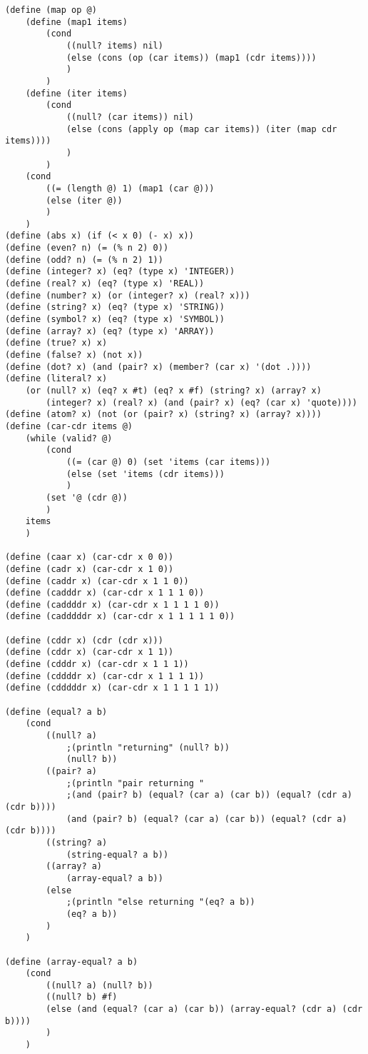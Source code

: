 \begin{verbatim}
(define (map op @)
    (define (map1 items)
        (cond
            ((null? items) nil)
            (else (cons (op (car items)) (map1 (cdr items))))
            )
        )
    (define (iter items)
        (cond
            ((null? (car items)) nil)
            (else (cons (apply op (map car items)) (iter (map cdr items))))
            )
        )
    (cond
        ((= (length @) 1) (map1 (car @)))
        (else (iter @))
        )
    )
(define (abs x) (if (< x 0) (- x) x))
(define (even? n) (= (% n 2) 0))
(define (odd? n) (= (% n 2) 1))
(define (integer? x) (eq? (type x) 'INTEGER))
(define (real? x) (eq? (type x) 'REAL))
(define (number? x) (or (integer? x) (real? x)))
(define (string? x) (eq? (type x) 'STRING))
(define (symbol? x) (eq? (type x) 'SYMBOL))
(define (array? x) (eq? (type x) 'ARRAY))
(define (true? x) x)
(define (false? x) (not x))
(define (dot? x) (and (pair? x) (member? (car x) '(dot .))))
(define (literal? x)
    (or (null? x) (eq? x #t) (eq? x #f) (string? x) (array? x)
        (integer? x) (real? x) (and (pair? x) (eq? (car x) 'quote))))
(define (atom? x) (not (or (pair? x) (string? x) (array? x))))
(define (car-cdr items @)
    (while (valid? @)
        (cond
            ((= (car @) 0) (set 'items (car items)))
            (else (set 'items (cdr items)))
            )
        (set '@ (cdr @))
        )
    items
    )

(define (caar x) (car-cdr x 0 0))
(define (cadr x) (car-cdr x 1 0))
(define (caddr x) (car-cdr x 1 1 0))
(define (cadddr x) (car-cdr x 1 1 1 0))
(define (caddddr x) (car-cdr x 1 1 1 1 0))
(define (cadddddr x) (car-cdr x 1 1 1 1 1 0))

(define (cddr x) (cdr (cdr x)))
(define (cddr x) (car-cdr x 1 1))
(define (cdddr x) (car-cdr x 1 1 1))
(define (cddddr x) (car-cdr x 1 1 1 1))
(define (cdddddr x) (car-cdr x 1 1 1 1 1))

(define (equal? a b)
    (cond
        ((null? a)
            ;(println "returning" (null? b))
            (null? b))
        ((pair? a)
            ;(println "pair returning "
            ;(and (pair? b) (equal? (car a) (car b)) (equal? (cdr a) (cdr b))))
            (and (pair? b) (equal? (car a) (car b)) (equal? (cdr a) (cdr b))))
        ((string? a)
            (string-equal? a b))
        ((array? a)
            (array-equal? a b))
        (else
            ;(println "else returning "(eq? a b))
            (eq? a b))
        )
    )

(define (array-equal? a b)
    (cond
        ((null? a) (null? b))
        ((null? b) #f)
        (else (and (equal? (car a) (car b)) (array-equal? (cdr a) (cdr b))))
        )
    )


\end{verbatim}
